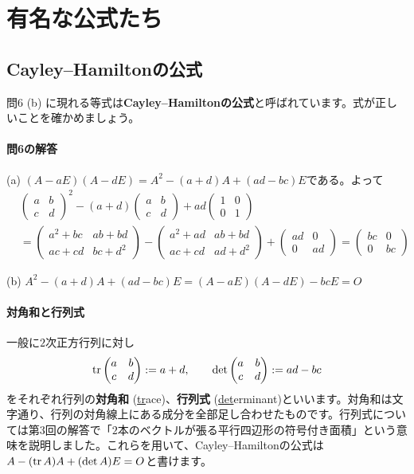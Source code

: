 \section{有名な公式たち}

\subsection{Cayley--Hamiltonの公式}

問6 (b) に現れる等式は\textbf{Cayley--Hamiltonの公式}と呼ばれています。式が正しいことを確かめましょう。

\paragraph{問6の解答}
(a) $(A - aE)(A - dE) = A^2 - (a+d) A + (ad-bc) E$である。よって
\begin{align*}
&\begin{pmatrix}
a & b \\ 
c & d 
\end{pmatrix}^2
-
(a+d)
\begin{pmatrix}
a & b \\ 
c & d 
\end{pmatrix}
+
ad
\begin{pmatrix}
1 & 0 \\ 
0 & 1 
\end{pmatrix} \\
&=
\begin{pmatrix}
a^2 +bc & ab +bd \\ 
ac +cd & bc + d^2 
\end{pmatrix}
-
\begin{pmatrix}
a^2 + ad & ab +bd\\ 
ac + cd & ad + d^2
\end{pmatrix}
+
\begin{pmatrix}
ad & 0 \\ 
0 & ad
\end{pmatrix}
=
\begin{pmatrix}
bc & 0\\ 
0 & bc
\end{pmatrix}
\end{align*}

(b) $A^2 - (a+d)A + (ad-bc) E = (A - aE)(A - dE) -bc E = O$

\paragraph{対角和と行列式} 一般に$2$次正方行列に対し
\[
\operatorname{tr}
\begin{pmatrix}
a & b \\
c  & d
\end{pmatrix}
:= a+d, \qquad
\det
\begin{pmatrix}
a & b \\
c  & d
\end{pmatrix}
:= ad - bc
\]
をそれぞれ行列の\textbf{対角和} (\underline{tr}ace)、\textbf{行列式} (\underline{det}erminant)といいます。対角和は文字通り、行列の対角線上にある成分を全部足し合わせたものです。行列式については第$3$回の解答で「$2$本のベクトルが張る平行四辺形の符号付き面積」という意味を説明しました。これらを用いて、Cayley--Hamiltonの公式は$A - (\operatorname{tr} A) A + (\det A) E = O$と書けます。

